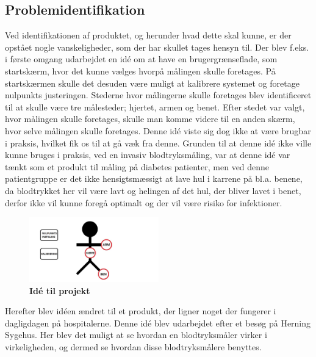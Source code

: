 \subsection{Problemidentifikation}
Ved identifikationen af produktet, og herunder hvad dette skal kunne, er der opstået nogle vanskeligheder, som der har skullet tages hensyn til. Der blev f.eks. i første omgang udarbejdet en idé om at have en brugergrænseflade, som startskærm, hvor det kunne vælges hvorpå målingen skulle foretages. På startskærmen skulle det desuden være muligt at kalibrere systemet og foretage nulpunkts justeringen. Stederne hvor målingerne skulle foretages blev identificeret til at skulle være tre målesteder; hjertet, armen og benet. Efter stedet var valgt, hvor målingen skulle foretages, skulle man komme videre til en anden skærm, hvor selve målingen skulle foretages. Denne idé viste sig dog ikke at være brugbar i praksis, hvilket fik os til at gå væk fra denne. Grunden til at denne idé ikke ville kunne bruges i praksis, ved en invasiv blodtryksmåling, var at denne idé var tænkt som et produkt til måling på diabetes patienter, men ved denne patientgruppe er det ikke hensigtsmæssigt at lave hul i karrene på bl.a. benene, da blodtrykket her vil være lavt og helingen af det hul, der bliver lavet i benet, derfor ikke vil kunne foregå optimalt og der vil være risiko for infektioner. \\
\begin{figure}[H]
\includegraphics[width =0.5\textwidth , center]{billeder/SkitseStartGammel}
\caption{\textbf{Idé til projekt}}
\end{figure}
Herefter blev idéen ændret til et produkt, der ligner noget der fungerer i dagligdagen på hospitalerne. Denne idé blev udarbejdet efter et besøg på Herning Sygehus. Her blev det muligt at se hvordan en blodtryksmåler virker i virkeligheden, og dermed se hvordan disse blodtryksmålere benyttes.\\
